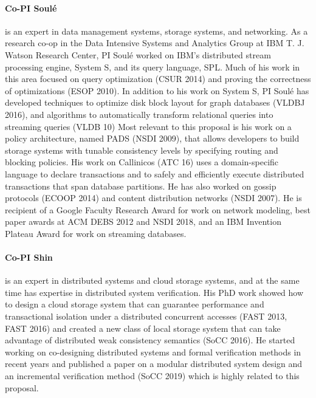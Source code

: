 \documentclass[11pt]{article}
\begin{document}
\paragraph{Co-PI Soul\'e} is an expert in data management systems,
storage systems, and networking. 
As a research co-op in the Data Intensive Systems and Analytics Group
at IBM T. J. Watson Research Center, PI Soul\'{e} worked on IBM's distributed
stream processing engine, System S, and its query language,
SPL. Much of his work in this area focused on query
optimization (CSUR 2014) and proving the correctness of
optimizations (ESOP 2010).  In addition to his work on System S, PI
Soul\'{e} has developed techniques to optimize disk block layout for
graph databases (VLDBJ 2016), and algorithms to automatically
transform relational queries into streaming queries (VLDB 10)
Most relevant to this proposal is his work on a policy architecture,
named PADS (NSDI 2009), that allows developers to build
storage systems with tunable consistency levels by specifying routing
and blocking policies. His work on Callinicos (ATC 16) uses a
domain-specific language to declare transactions and to safely and
efficiently execute distributed transactions that span database
partitions.  He has also worked on gossip
protocols (ECOOP 2014) and content distribution
networks (NSDI 2007). He is recipient of a Google Faculty Research Award for work on network
modeling, best paper awards at ACM DEBS 2012 and NSDI 2018, and an IBM
Invention Plateau Award for work on streaming databases.

\paragraph{Co-PI Shin} is an expert in distributed systems and 
cloud storage systems, and at the same time
has expertise in distributed system verification. His PhD work
showed how to design a cloud storage system that can guarantee
performance and transactional isolation under a distributed concurrent
accesses (FAST 2013, FAST 2016) and created a new class of
local storage system that can take advantage of distributed weak
consistency semantics (SoCC 2016). He started working on co-designing
distributed systems and formal verification methods
in recent years and published a paper on a modular distributed
system design and an incremental verification method (SoCC 2019) 
which is highly related to this proposal. 

\end{document}
